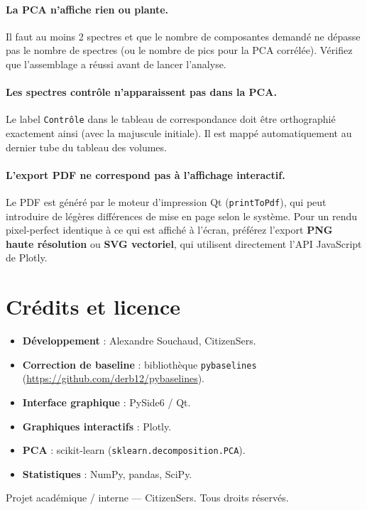 \documentclass[12pt, a4paper]{article}
\begin{document}
\paragraph{La PCA n'affiche rien ou plante.}
Il faut au moins 2 spectres et que le nombre de composantes demandé ne
dépasse pas le nombre de spectres (ou le nombre de pics pour la PCA
corrélée). Vérifiez que l'assemblage a réussi avant de lancer l'analyse.

\paragraph{Les spectres contrôle n'apparaissent pas dans la PCA.}
Le label \texttt{Contrôle} dans le tableau de correspondance doit être
orthographié exactement ainsi (avec la majuscule initiale). Il est mappé
automatiquement au dernier tube du tableau des volumes.

\paragraph{L'export PDF ne correspond pas à l'affichage interactif.}
Le PDF est généré par le moteur d'impression Qt (\texttt{printToPdf}),
qui peut introduire de légères différences de mise en page selon le système.
Pour un rendu pixel-perfect identique à ce qui est affiché à l'écran,
préférez l'export \textbf{PNG haute résolution} ou \textbf{SVG vectoriel},
qui utilisent directement l'API JavaScript de Plotly.

\section{Crédits et licence}

\begin{itemize}
  \item \textbf{Développement} : Alexandre Souchaud, CitizenSers.
  \item \textbf{Correction de baseline} : bibliothèque \texttt{pybaselines}
        (\url{https://github.com/derb12/pybaselines}).
  \item \textbf{Interface graphique} : PySide6 / Qt.
  \item \textbf{Graphiques interactifs} : Plotly.
  \item \textbf{PCA} : scikit-learn (\texttt{sklearn.decomposition.PCA}).
  \item \textbf{Statistiques} : NumPy, pandas, SciPy.
\end{itemize}

\medskip
Projet académique / interne --- CitizenSers. Tous droits réservés.
\end{document}
